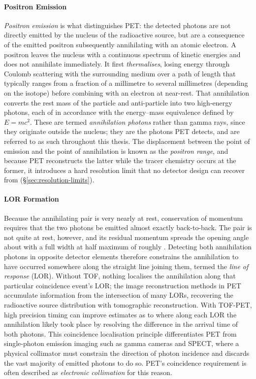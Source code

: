 \paragraph{Positron Emission}
\emph{Positron emission} is what distinguishes PET: the detected photons are not directly emitted by the nucleus of the radioactive source, but are a consequence of the emitted positron subsequently annihilating with an atomic electron.
A positron leaves the nucleus with a continuous spectrum of kinetic energies and does not annihilate immediately.
It first \emph{thermalises}, losing energy through Coulomb scattering with the surrounding medium over a path of length that typically ranges from a fraction of a millimetre to several millimetres (depending on the isotope) before combining with an electron at near-rest.
That annihilation converts the rest mass of the particle and anti-particle into two high-energy photons, each of  in accordance with the energy--mass equivalence defined by $E=mc^2$.
These are termed \emph{annihilation photons} rather than gamma rays, since they originate outside the nucleus; they are the photons PET detects, and are referred to as such throughout this thesis.
The displacement between the point of emission and the point of annihilation is known as the \emph{positron range}, and because PET reconstructs the latter while the tracer chemistry occurs at the former, it introduces a hard resolution limit that no detector design can recover from (\S\ref{sec:resolution-limits}).

\paragraph{LOR Formation}
Because the annihilating pair is very nearly at rest, conservation of momentum requires that the two photons be emitted almost exactly back-to-back.
The pair is not quite at rest, however, and its residual momentum spreads the opening angle about  with a full width at half maximum of roughly .
Detecting both annihilation photons in opposite detector elements therefore constrains the annihilation to have occurred somewhere along the straight line joining them, termed the \emph{line of response} (LOR).
Without TOF, nothing localises the annihilation along that particular coincidence event's LOR; the image reconstruction methods in PET accumulate information from the intersection of many LORs, recovering the radioactive source distribution with tomographic reconstruction.
With TOF-PET, high precision timing can improve estimates as to where along each LOR the annihilation likely took place by resolving the difference in the arrival time of both photons.
This coincidence localisation principle differentiates PET from single-photon emission imaging such as gamma cameras and SPECT, where a physical collimator must constrain the direction of photon incidence and discards the vast majority of emitted photons to do so.
PET's coincidence requirement is often described as \emph{electronic collimation} for this reason.


